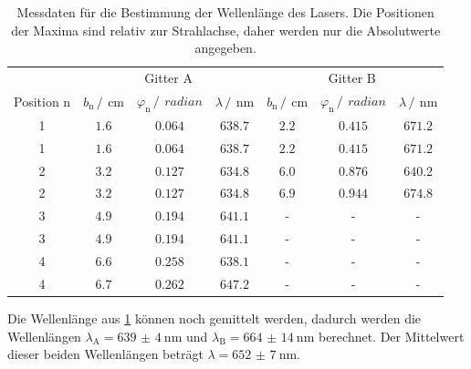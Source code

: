 \begin{table}
  \centering
  \caption{Messdaten für die Bestimmung der Wellenlänge des Lasers. Die Positionen der Maxima sind relativ zur Strahlachse, daher werden nur die Absolutwerte angegeben.}
  \label{tab:Maxposi}
  \begin{tabular}{c c c c| c c c}
    \toprule
    &\multicolumn{3}{c}{Gitter A}&\multicolumn{3}{c}{Gitter B}\\
    \cmidrule(lr){2-4} \cmidrule(lr){5-7}
    Position n&$b_{\text{n}}\,/\,\SI{}{\centi\meter}$&$\varphi_{\text{n}}\,/\,\SI{}{radian}$&$\lambda\,/\,\SI{}{\nano\meter}$&$b_{\text{n}}\,/\,\SI{}{\centi\meter}$&$\varphi_{\text{n}}\,/\,\SI{}{radian}$&$\lambda\,/\,\SI{}{\nano\meter}$\\
    \midrule
    1&$\num{1.6}$&$\num{0.064}$&$\num{638.7}$&$\num{2.2}$&$\num{0.415}$&$\num{671.2}$\\
    1&$\num{1.6}$&$\num{0.064}$&$\num{638.7}$&$\num{2.2}$&$\num{0.415}$&$\num{671.2}$\\
    2&$\num{3.2}$&$\num{0.127}$&$\num{634.8}$&$\num{6.0}$&$\num{0.876}$&$\num{640.2}$\\
    2&$\num{3.2}$&$\num{0.127}$&$\num{634.8}$&$\num{6.9}$&$\num{0.944}$&$\num{674.8}$\\
    3&$\num{4.9}$&$\num{0.194}$&$\num{641.1}$&-&-&-\\
    3&$\num{4.9}$&$\num{0.194}$&$\num{641.1}$&-&-&-\\
    4&$\num{6.6}$&$\num{0.258}$&$\num{638.1}$&-&-&-\\
    4&$\num{6.7}$&$\num{0.262}$&$\num{647.2}$&-&-&-\\
    \bottomrule
  \end{tabular}
\end{table}
\FloatBarrier 
Die Wellenlänge aus \ref{tab:Maxposi} können noch gemittelt werden, dadurch werden die Wellenlängen $\lambda_{\text{A}}=\SI{639(4)}{\nano\meter}$ und
$\lambda_{\text{B}}=\SI{664(14)}{\nano\meter}$ berechnet. Der Mittelwert dieser beiden Wellenlängen beträgt $\lambda=\SI{652(7)}{\nano\meter}$.